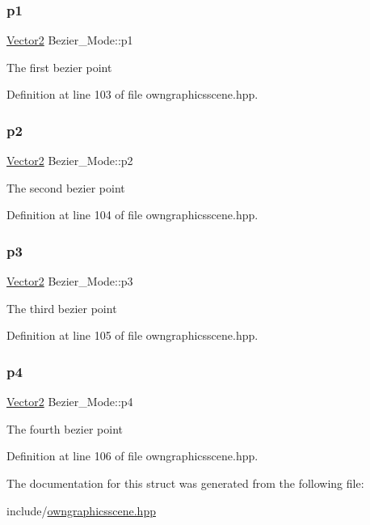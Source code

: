 \subsubsection{\texorpdfstring{p1}{p1}}
{\footnotesize\ttfamily \mbox{\hyperlink{classVector2}{Vector2}} Bezier\+\_\+\+Mode\+::p1}

The first bezier point 

Definition at line 103 of file owngraphicsscene.\+hpp.

\mbox{\label{structBezier__Mode_a96ed0f4076e540e5a8789f25f9bf65e9}} 
\subsubsection{\texorpdfstring{p2}{p2}}
{\footnotesize\ttfamily \mbox{\hyperlink{classVector2}{Vector2}} Bezier\+\_\+\+Mode\+::p2}

The second bezier point 

Definition at line 104 of file owngraphicsscene.\+hpp.

\mbox{\label{structBezier__Mode_ad9fbff84a5248923ceb29433dc58f49b}} 
\subsubsection{\texorpdfstring{p3}{p3}}
{\footnotesize\ttfamily \mbox{\hyperlink{classVector2}{Vector2}} Bezier\+\_\+\+Mode\+::p3}

The third bezier point 

Definition at line 105 of file owngraphicsscene.\+hpp.

\mbox{\label{structBezier__Mode_a5a3df46137ba62eaf3f9c0ad1ee391ef}} 
\subsubsection{\texorpdfstring{p4}{p4}}
{\footnotesize\ttfamily \mbox{\hyperlink{classVector2}{Vector2}} Bezier\+\_\+\+Mode\+::p4}

The fourth bezier point 

Definition at line 106 of file owngraphicsscene.\+hpp.



The documentation for this struct was generated from the following file\+:\begin{DoxyCompactItemize}
\item 
include/\mbox{\hyperlink{owngraphicsscene_8hpp}{owngraphicsscene.\+hpp}}\end{DoxyCompactItemize}
